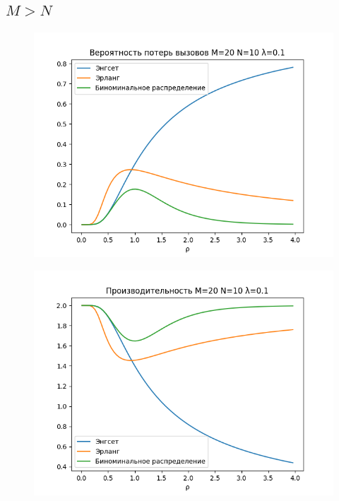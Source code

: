 \documentclass[12pt]{article}
\let\Oldsubsection\subsection
\renewcommand{\subsection}{\FloatBarrier\Oldsubsection}
\begin{document}
\subsection{$M > N$}\label{subsec2:}
\begin{figure}[!htb]
\centering
\includegraphics[scale=1.00]{assets/iss_3/loss_prob_M20_N10_lam01.png}
\caption{}
\label{}
\end{figure}

\begin{figure}[!htb]
\centering
\includegraphics[scale=1.00]{assets/iss_3/perf_M20_N10_lam01.png}
\caption{}
\label{}
\end{figure}
\end{document}
